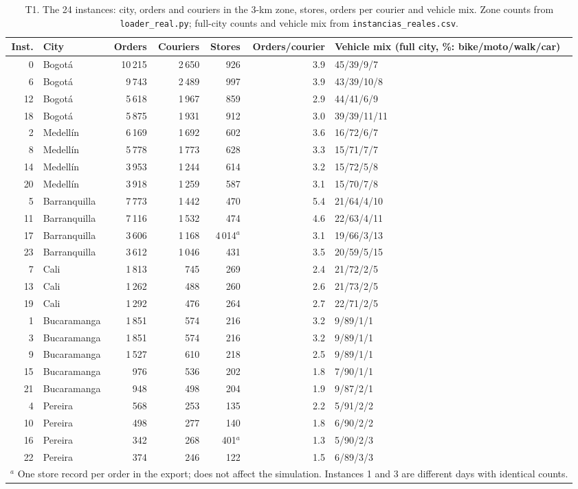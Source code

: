 \documentclass[preprint,12pt,authoryear]{elsarticle}%
\begin{document}
\begin{table}[ht]
\centering\small
\caption{T1. The 24 instances: city, orders and couriers in the 3-km zone, stores, orders per courier and vehicle mix. Zone counts from \texttt{loader\_real.py}; full-city counts and vehicle mix from \texttt{instancias\_reales.csv}.}
\label{tab:instances}
\begin{tabular}{rlrrrrl}
\toprule
Inst. & City & Orders & Couriers & Stores & Orders/courier & Vehicle mix (full city, \%: bike/moto/walk/car) \\
\midrule
0 & Bogot\'a & 10\,215 & 2\,650 & 926 & 3.9 & 45/39/9/7 \\
6 & Bogot\'a & 9\,743 & 2\,489 & 997 & 3.9 & 43/39/10/8 \\
12 & Bogot\'a & 5\,618 & 1\,967 & 859 & 2.9 & 44/41/6/9 \\
18 & Bogot\'a & 5\,875 & 1\,931 & 912 & 3.0 & 39/39/11/11 \\
2 & Medell\'in & 6\,169 & 1\,692 & 602 & 3.6 & 16/72/6/7 \\
8 & Medell\'in & 5\,778 & 1\,773 & 628 & 3.3 & 15/71/7/7 \\
14 & Medell\'in & 3\,953 & 1\,244 & 614 & 3.2 & 15/72/5/8 \\
20 & Medell\'in & 3\,918 & 1\,259 & 587 & 3.1 & 15/70/7/8 \\
5 & Barranquilla & 7\,773 & 1\,442 & 470 & 5.4 & 21/64/4/10 \\
11 & Barranquilla & 7\,116 & 1\,532 & 474 & 4.6 & 22/63/4/11 \\
17 & Barranquilla & 3\,606 & 1\,168 & 4\,014$^{a}$ & 3.1 & 19/66/3/13 \\
23 & Barranquilla & 3\,612 & 1\,046 & 431 & 3.5 & 20/59/5/15 \\
7 & Cali & 1\,813 & 745 & 269 & 2.4 & 21/72/2/5 \\
13 & Cali & 1\,262 & 488 & 260 & 2.6 & 21/73/2/5 \\
19 & Cali & 1\,292 & 476 & 264 & 2.7 & 22/71/2/5 \\
1 & Bucaramanga & 1\,851 & 574 & 216 & 3.2 & 9/89/1/1 \\
3 & Bucaramanga & 1\,851 & 574 & 216 & 3.2 & 9/89/1/1 \\
9 & Bucaramanga & 1\,527 & 610 & 218 & 2.5 & 9/89/1/1 \\
15 & Bucaramanga & 976 & 536 & 202 & 1.8 & 7/90/1/1 \\
21 & Bucaramanga & 948 & 498 & 204 & 1.9 & 9/87/2/1 \\
4 & Pereira & 568 & 253 & 135 & 2.2 & 5/91/2/2 \\
10 & Pereira & 498 & 277 & 140 & 1.8 & 6/90/2/2 \\
16 & Pereira & 342 & 268 & 401$^{a}$ & 1.3 & 5/90/2/3 \\
22 & Pereira & 374 & 246 & 122 & 1.5 & 6/89/3/3 \\
\bottomrule
\multicolumn{7}{l}{\footnotesize $^{a}$ One store record per order in the export; does not affect the simulation. Instances 1 and 3 are different days with identical counts.}
\end{tabular}
\end{table}
\end{document}
